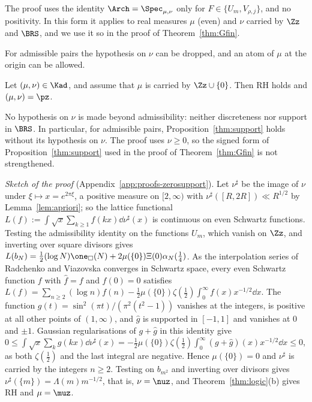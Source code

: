 The proof uses the identity $\Arch=\Spec_{\mu,\nu}$ only for $F\in\{U_m,V_{\rho,j}\}$, and no positivity. In this form it applies to
real measures $\mu$ (even) and $\nu$ carried by $\Zz$ and $\BRS$, and we use it so in the proof of Theorem~\ref{thm:Gfin}.

For admissible pairs the hypothesis on $\nu$ can be dropped, and an atom of $\mu$ at the origin can be allowed.

\begin{theorem}\label{thm:zerosupport}
Let $(\mu,\nu)\in\Kad$, and assume that $\mu$ is carried by $\Zz\cup\{0\}$. Then RH holds and $(\mu,\nu)=\pz$.\astranote
\end{theorem}

No hypothesis on $\nu$ is made beyond admissibility: neither discreteness nor support in $\BRS$. In particular, for admissible pairs,
Proposition~\ref{thm:support} holds without its hypothesis on $\nu$. The proof uses $\nu\ge0$, so the signed form of
Proposition~\ref{thm:support} used in the proof of Theorem~\ref{thm:Gfin} is not strengthened.

\emph{Sketch of the proof} (Appendix~\ref{app:proofs-zerosupport}). Let $\nu^\sharp$ be the image of $\nu$ under $\xi\mapsto x=e^{2\pi\xi}$, a
positive measure on $[2,\infty)$ with $\nu^\sharp([R,2R])\ll R^{1/2}$ by Lemma~\ref{lem:apriori}; so the lattice functional
$L(f):=\int\sqrt x\sum_{k\ge1}f(kx)\dd\nu^\sharp(x)$ is continuous on even Schwartz functions. Testing the admissibility identity on the
functions $U_m$, which vanish on $\Zz$, and inverting over square divisors gives $L(b_N)=\frac12(\log N)\one_\square(N)+2\mu(\{0\})\Xi(0)\alpha_N(\frac14)$.
As the interpolation series of Radchenko and Viazovska converges in Schwartz space, every even Schwartz function $f$ with $\hat f=f$ and
$f(0)=0$ satisfies $L(f)=\sum_{n\ge2}(\log n)f(n)-\frac12\mu(\{0\})\zeta(\frac12)\int_0^\infty f(x)x^{-1/2}\dd x$. The function
$g(t)=\sin^2(\pi t)/(\pi^2(t^2-1))$ vanishes at the integers, is positive at all other points of $(1,\infty)$, and $\hat g$ is supported in
$[-1,1]$ and vanishes at $0$ and $\pm1$. Gaussian regularisations of $g+\hat g$ in this identity give
$0\le\int\sqrt x\sum_kg(kx)\dd\nu^\sharp(x)=-\frac12\mu(\{0\})\zeta(\frac12)\int_0^\infty(g+\hat g)(x)x^{-1/2}\dd x\le0$, as both $\zeta(\frac12)$
and the last integral are negative. Hence $\mu(\{0\})=0$ and $\nu^\sharp$ is carried by the integers $n\ge2$. Testing on $b_{m^2}$ and inverting
over divisors gives $\nu^\sharp(\{m\})=\Lambda(m)m^{-1/2}$, that is, $\nu=\nuz$, and Theorem~\ref{thm:logic}(b) gives RH and $\mu=\muz$.


